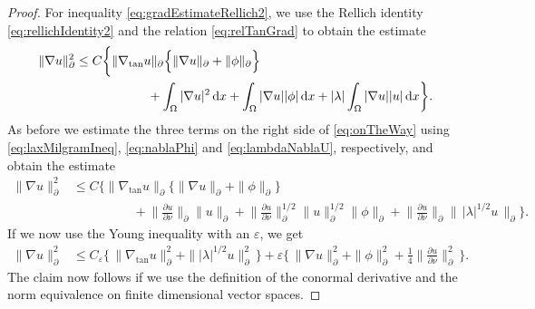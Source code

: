 \begin{proof}
  For inequality \eqref{eq:gradEstimateRellich2}, we use the Rellich identity \eqref{eq:rellichIdentity2} and the relation \eqref{eq:relTanGrad} to obtain the estimate
  \begin{align}
    \label{eq:onTheWay}
    \begin{alignedat}{1}
    \| \nabla u\|_\partial^2 
    &\leq C \bigg\{ \|\nabla_{\mathrm{tan}} u\|_\partial 
    \Big\{ \|\nabla u\|_\partial + \|\phi\|_\partial \Big\}   \\
    &\hspace{2cm} + \int_\Omega |\nabla u|^2 \, {\operatorname{d}\!{x}} + \int_\Omega |\nabla u| |\phi| \, {\operatorname{d}\!{x}} + |\lambda| \int_\Omega |\nabla u| |u|\, {\operatorname{d}\!{x}} \bigg\}.
  \end{alignedat}
  \end{align}
  As before we estimate the three terms on the right side of \eqref{eq:onTheWay} using \eqref{eq:laxMilgramIneq}, \eqref{eq:nablaPhi} and \eqref{eq:lambdaNablaU}, respectively, and obtain the estimate
  \begin{align*}
    \| \nabla u\|_\partial^2 
    &\leq C \bigg\{ \|\nabla_{\mathrm{tan}} u\|_\partial 
    \Big\{ \|\nabla u\|_\partial + \|\phi\|_\partial \Big\}   \\
    &\hspace{2cm} + \Big\| \frac{\partial u}{\partial \nu} \Big\|_\partial \| u\|_\partial
    + \Big\| \frac{\partial u}{\partial \nu} \Big\|_\partial^{1/2} \|u\|_\partial^{1/2} \|\phi\|_\partial + \Big\| \frac{\partial u}{\partial \nu} \Big\|_\partial \big\|\, |\lambda|^{1/2} u \, \big\|_\partial \bigg\}.
  \end{align*}
  If we now use the Young inequality with an $\varepsilon$, we get
  \begin{align*}
    \|\nabla u\|_\partial^2 
    &\leq C_\varepsilon \big\{ \, \|\nabla_{\mathrm{tan}} u\|_\partial^2 + \| |\lambda|^{1/2} u\|_\partial^2 \, \big\}  + \varepsilon \bigg\{ \, \|\nabla u\|_\partial^2 + \|\phi\|_\partial^2 + \frac{1}{4}\Big\|\frac{\partial u}{\partial \nu} \Big\|_\partial^2 \, \bigg\}.
  \end{align*}
  The claim now follows if we use the definition of the conormal derivative and the norm equivalence on finite dimensional vector spaces.
\end{proof}


